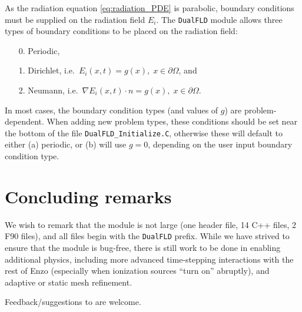 \documentclass[letterpaper,10pt]{article}
\renewcommand{\(}{\left(}
\renewcommand{\)}{\right)}
\begin{document}
As the radiation equation \eqref{eq:radiation_PDE} is parabolic,
boundary conditions must be supplied on the radiation field $E_i$.  The
{\tt DualFLD} module allows three types of boundary conditions to
be placed on the radiation field:
\begin{itemize}
\item[0.] Periodic,
\item[1.] Dirichlet, i.e.~$E_i(x,t) = g(x), \; x\in\partial\Omega$, and
\item[2.] Neumann, i.e.~$\nabla E_i(x,t)\cdot n = g(x), \; x\in\partial\Omega$.
\end{itemize}
In most cases, the boundary condition types (and values of $g$) are
problem-dependent.  When adding new problem types, these conditions
should be set near the bottom of the file {\tt DualFLD\_Initialize.C}, 
otherwise these will default to either (a) periodic, or (b) will use
$g=0$, depending on the user input boundary condition type.



\section{Concluding remarks}
\label{sec:conclusions}

We wish to remark that the module is not large (one header
file, 14 C++ files, 2 F90 files), and all files begin with the 
{\tt DualFLD} prefix.  While we have strived to ensure that the
module is bug-free, there is still work to be done in enabling
additional physics, including more advanced time-stepping interactions
with the rest of Enzo (especially when ionization sources ``turn on''
abruptly), and adaptive or static mesh refinement.  

Feedback/suggestions to are welcome.




\end{document}
